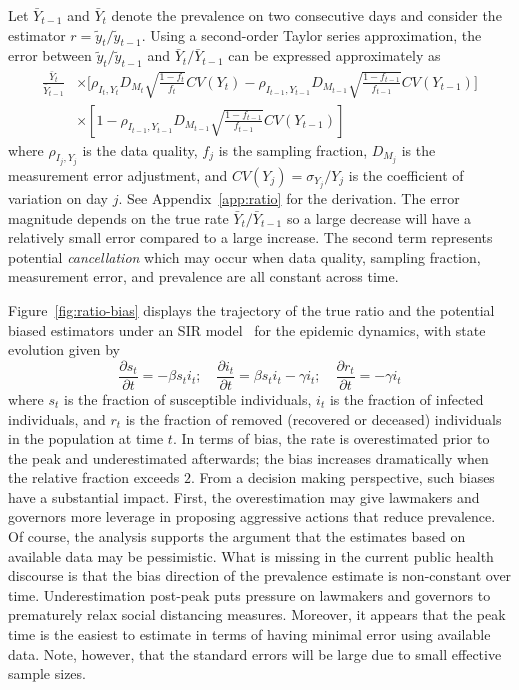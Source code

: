 \documentclass[11pt]{amsart}
\begin{document}
Let $\bar Y_{t-1}$ and $\bar Y_{t}$ denote the prevalence on two consecutive days and consider the estimator $r = \tilde y_t / \tilde y_{t-1}$.  Using a second-order Taylor series approximation, the error between ${\tilde y_t}/{\tilde y_{t-1}}$ and ${\bar Y_{t}}/{\bar Y_{t-1}}$ can be expressed approximately as
$$
\begin{aligned}
\frac{\bar Y_t}{\bar Y_{t-1}} &\times \bigg[ \rho_{I_t,Y_t} D_{M_t} \sqrt{\frac{1-f_t}{f_t}} CV (Y_t)  -\rho_{I_{t-1},Y_{t-1}} D_{M_{t-1}} \sqrt{\frac{1-f_{t-1}}{f_{t-1}}} CV (Y_{t-1}) \bigg] \\
&\times \left[ 1 - \rho_{I_{t-1},Y_{t-1}} D_{M_{t-1}} \sqrt{\frac{1-f_{t-1}}{f_{t-1}}} CV (Y_{t-1}) \right]
\end{aligned}
$$
where $\rho_{I_j, Y_j}$ is the data quality, $f_j$ is the sampling fraction, $D_{M_j}$ is the measurement error adjustment, and $CV(Y_j) = \sigma_{Y_j}/Y_j$ is the coefficient of variation on day $j$.  See Appendix~\ref{app:ratio} for the derivation. The error magnitude depends on the true rate $\bar Y_{t} / \bar Y_{t-1}$ so a large decrease will have a relatively small error compared to a large increase. The second term represents potential \emph{cancellation} which may occur when data quality, sampling fraction, measurement error, and prevalence are all constant across time.

Figure~\ref{fig:ratio-bias} displays the trajectory of the true ratio and the potential biased estimators under an SIR model~\citep{Pastor2001,Newman2002,Parshani2010} for the epidemic dynamics, with state evolution given by
\begin{equation}
\label{eq:sir}
\frac{\partial s_t}{\partial t} = - \beta s_t i_t; \quad
\frac{\partial i_t}{\partial t} = \beta s_t i_t - \gamma i_t; \quad
\frac{\partial r_t}{\partial t} = - \gamma i_t
\end{equation}
where $s_t$ is the fraction of susceptible individuals, $i_t$ is the fraction of infected individuals, and $r_t$ is the fraction of removed (recovered or deceased) individuals in the population at time $t$.  In terms of bias, the rate is overestimated prior to the peak and underestimated afterwards; the bias increases dramatically when the relative fraction exceeds $2$.  From a decision making perspective, such biases have a substantial impact.  First, the overestimation may give lawmakers and governors more leverage in proposing aggressive actions that reduce prevalence.  Of course, the analysis supports the argument that the estimates based on available data may be pessimistic. What is missing in the current public health discourse is that the bias direction of the prevalence estimate is non-constant over time.   Underestimation post-peak puts pressure on lawmakers and governors to prematurely relax social distancing measures.  Moreover, it appears that the peak time is the easiest to estimate in terms of having minimal error using available data.  Note, however, that the standard errors will be large due to small effective sample sizes.
\end{document}
